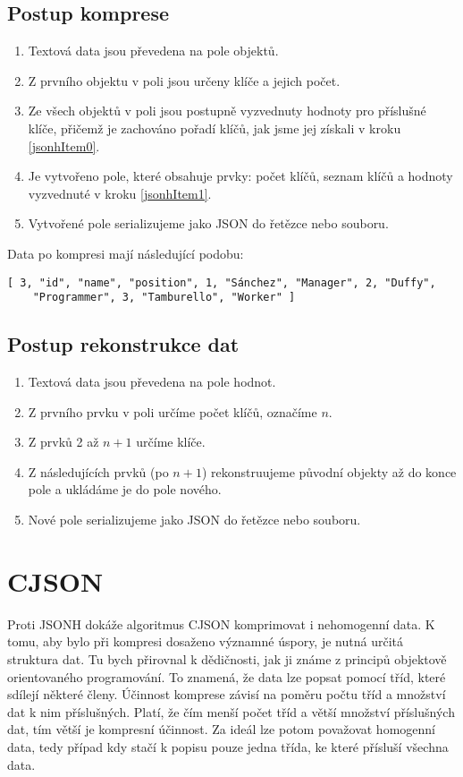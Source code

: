 \subsection{Postup komprese}
\begin{enumerate}
\item Textová data jsou převedena na pole objektů.
\item \label{jsonhItem0} Z prvního objektu v poli jsou určeny klíče a jejich počet.
\item \label{jsonhItem1} Ze všech objektů v poli jsou postupně vyzvednuty hodnoty pro příslušné klíče, přičemž je zachováno pořadí klíčů, jak jsme jej získali v kroku \ref{jsonhItem0}.
\item Je vytvořeno pole, které obsahuje prvky: počet klíčů, seznam klíčů a hodnoty vyzvednuté v kroku \ref{jsonhItem1}.
\item Vytvořené pole serializujeme jako JSON do řetězce nebo souboru.
\end{enumerate}

Data po kompresi mají následující podobu:
\begin{verbatim}
[ 3, "id", "name", "position", 1, "Sánchez", "Manager", 2, "Duffy",
    "Programmer", 3, "Tamburello", "Worker" ]
\end{verbatim}

\subsection{Postup rekonstrukce dat}
\begin{enumerate}
\item Textová data jsou převedena na pole hodnot.
\item Z prvního prvku v poli určíme počet klíčů, označíme $n$.
\item Z prvků 2 až $n+1$ určíme klíče.
\item Z následujících prvků (po $n+1$) rekonstruujeme původní objekty až do konce pole a ukládáme je do pole nového.
\item Nové pole serializujeme jako JSON do řetězce nebo souboru.
\end{enumerate}

\section{CJSON}
\label{cjson}
Proti JSONH dokáže algoritmus CJSON komprimovat i nehomogenní data. K tomu, aby bylo při kompresi dosaženo významné úspory, je nutná určitá struktura dat. Tu bych přirovnal k dědičnosti, jak ji známe z principů objektově orientovaného programování. To znamená, že data lze popsat pomocí tříd, které sdílejí některé členy. Účinnost komprese závisí na poměru počtu tříd a množství dat k nim příslušných. Platí, že čím menší počet tříd a větší množství příslušných dat, tím větší je kompresní účinnost. Za ideál lze potom považovat homogenní data, tedy případ kdy stačí k popisu pouze jedna třída, ke které přísluší všechna data.

